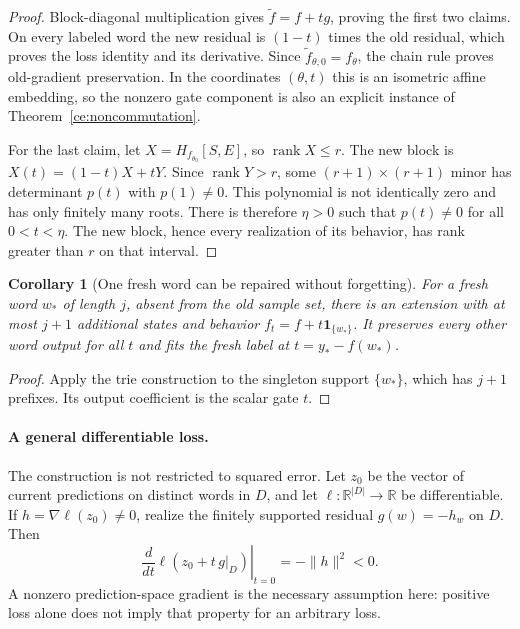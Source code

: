 \documentclass[11pt]{article}
\newtheorem{corollary}[theorem]{Corollary}
\theoremstyle{definition}
\theoremstyle{remark}
\begin{document}
\begin{proof}
Block-diagonal multiplication gives $\widetilde f=f+tg$, proving the
first two claims. On every labeled word the new residual is $(1-t)$ times
the old residual, which proves the loss identity and its derivative.
Since $\widetilde f_{\theta,0}=f_\theta$, the chain rule proves old-gradient
preservation. In the coordinates $(\theta,t)$ this is an isometric affine
embedding, so the nonzero gate component is also an explicit instance of
Theorem~\ref{ce:noncommutation}.

For the last claim, let $X=H_{f_{\theta_0}}[S,E]$, so
$\operatorname{rank}X\leq r$. The new block is
$X(t)=(1-t)X+tY$. Since $\operatorname{rank}Y>r$, some
$(r+1)\times(r+1)$ minor has determinant $p(t)$ with $p(1)\ne0$.
This polynomial is not identically zero and has only finitely many roots.
There is therefore $\eta>0$ such that $p(t)\ne0$ for all
$0<t<\eta$. The new block, hence every realization of its behavior, has
rank greater than $r$ on that interval.
\end{proof}


\begin{corollary}[One fresh word can be repaired without forgetting]
\label{ce:single-word}
For a fresh word $w_*$ of length $j$, absent from the old sample set,
there is an extension with at most $j+1$ additional states and behavior
$f_t=f+t\mathbf1_{\{w_*\}}$. It preserves every other word output for
all $t$ and fits the fresh label at $t=y_*-f(w_*)$.
\end{corollary}
\begin{proof}
Apply the trie construction to the singleton support $\{w_*\}$, which
has $j+1$ prefixes. Its output coefficient is the scalar gate $t$.
\end{proof}

\paragraph{A general differentiable loss.}
The construction is not restricted to squared error. Let $z_0$ be the
vector of current predictions on distinct words in $D$, and let
$\ell:\mathbb R^{|D|}\to\mathbb R$ be differentiable. If
$h=\nabla\ell(z_0)\ne0$, realize the finitely supported residual
$g(w)=-h_w$ on $D$. Then
\[
 \left.\frac{d}{dt}\ell(z_0+t\,g|_D)\right|_{t=0}=-\|h\|^2<0.
\]
A nonzero prediction-space gradient is the necessary assumption here:
positive loss alone does not imply that property for an arbitrary loss.
\end{document}
